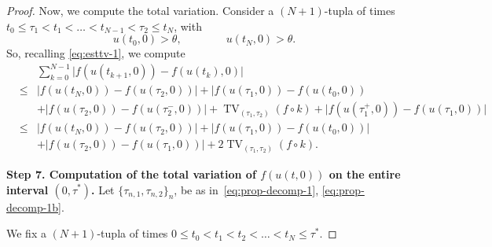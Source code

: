 \documentclass[a4paper, 10pt, final]{article}
\DeclareMathOperator{\tv}{TV}
\begin{document}
\begin{proof}
  
  

  Now, we  compute the total variation. 
  Consider a $(N+1)$-tupla of times $t_0\leq \tau_1<t_1<\dots< t_{N-1}<\tau_2\leq t_N$, with 
  \begin{equation}
  \label{eq:TVest-1}
      u(t_0,0)>\theta,\qquad\qquad 
      u(t_N,0)>\theta.
  \end{equation}
  So, recalling \eqref{eq:esttv-1}, we compute 
  \begin{eqnarray}
  \nonumber 
  &&
      \sum_{k=0}^{N-1}
      \big|f(u(t_{k+1},0))-f(u(t_k),0)\big|\\ \nonumber 
  &\leq &   
      \big|f( u(t_N,0))-f(u(\tau_{2},0))\big|+\big|f( u(\tau_{1},0))-f(u(t_0,0))\\\nonumber 
      &&
      +
      \big|f( u(\tau_{2},0))-f(u(\tau_{2}^-,0))\big|
    +\tv_{(\tau_{1}, \tau_{2})} (f\circ k)+
      \big|f( u(\tau_{1}^+,0))-f(u(\tau_{1},0))\big| 
      \\\nonumber 
      &\leq  & \big|f( u(t_N,0))-f(u(\tau_{2},0))\big|+\big|f( u(\tau_{1},0))-f(u(t_0,0)) \big|
      \\ 
      &&
      +
      \big|f( u(\tau_{2},0))-f(u(\tau_{1},0))\big|
    +2\tv_{(\tau_{1}, \tau_{2})} (f\circ k). \label{eq:esttv-3}
  \end{eqnarray}
  \smallskip

  \noindent
  {\bf Step 7. Computation of the total variation of $f(u(t,0))$ on the entire interval $(0, \tau^*)$.}
  Let $\big\{\tau_{n,1}, \tau_{n,2}\big\}_n$,
  be as in~\eqref{eq:prop-decomp-1}, \eqref{eq:prop-decomp-1b}.  

  
  We fix a  $(N+1)$-tupla of times $0\leq t_0< t_1<t_2<\dots< t_{N}\leq \tau^*$.


\end{proof}
\end{document}

